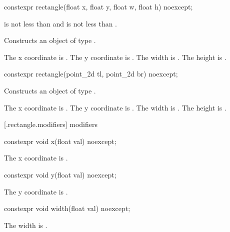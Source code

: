 %
\begin{itemdecl}
constexpr rectangle(float x, float y, float w, float h) noexcept;
\end{itemdecl}
\begin{itemdescr}
\pnum
\requires
{} is not less than  and  is not less than .

\pnum
\effects
Constructs an object of type .

\pnum
The x coordinate is . The y coordinate is . The width is . The height is .
\end{itemdescr}

%
\begin{itemdecl}
constexpr rectangle(point_2d tl, point_2d br) noexcept;
\end{itemdecl}
\begin{itemdescr}
\pnum
\effects
Constructs an object of type .

\pnum
The x coordinate is . The y coordinate is . The width is . The height is .
\end{itemdescr}

 [\iotwod.rectangle.modifiers]{ modifiers}

%
\begin{itemdecl}
constexpr void x(float val) noexcept;
\end{itemdecl}

\begin{itemdescr}
\pnum
\effects
The x coordinate is .
\end{itemdescr}

%
\begin{itemdecl}
constexpr void y(float val) noexcept;
\end{itemdecl}
\begin{itemdescr}
\pnum
\effects
The y coordinate is .
\end{itemdescr}

%
\begin{itemdecl}
constexpr void width(float val) noexcept;
\end{itemdecl}
\begin{itemdescr}
\pnum
\effects
The width is .
\end{itemdescr}

